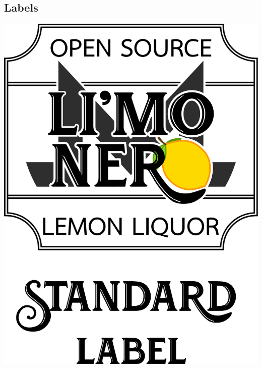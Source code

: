 \documentclass[12pt,a4paper]{article}
\begin{document}
\subsection{Labels}
\begin{center}
\includegraphics[width=1\textwidth]{img/std-label.pdf}
\end{center}
\end{document}
